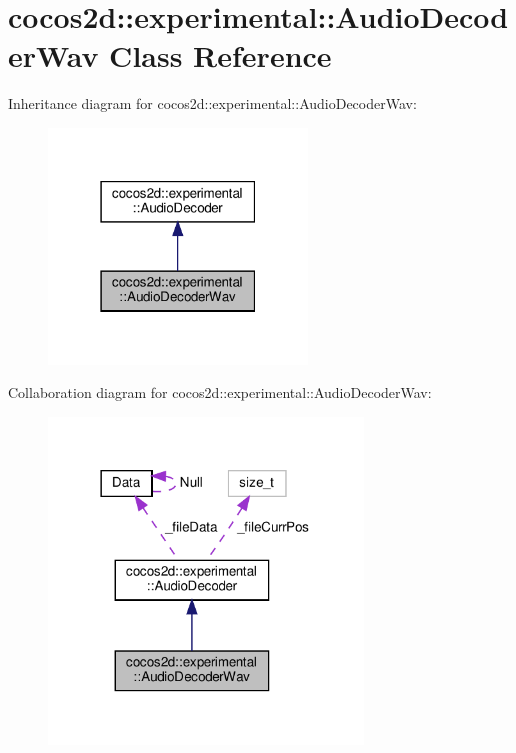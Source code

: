 \hypertarget{classcocos2d_1_1experimental_1_1AudioDecoderWav}{}\section{cocos2d\+:\+:experimental\+:\+:Audio\+Decoder\+Wav Class Reference}
\label{classcocos2d_1_1experimental_1_1AudioDecoderWav}


Inheritance diagram for cocos2d\+:\+:experimental\+:\+:Audio\+Decoder\+Wav\+:
\nopagebreak
\begin{figure}[H]
\begin{center}
\leavevmode
\includegraphics[width=195pt]{classcocos2d_1_1experimental_1_1AudioDecoderWav__inherit__graph}
\end{center}
\end{figure}


Collaboration diagram for cocos2d\+:\+:experimental\+:\+:Audio\+Decoder\+Wav\+:
\nopagebreak
\begin{figure}[H]
\begin{center}
\leavevmode
\includegraphics[width=237pt]{classcocos2d_1_1experimental_1_1AudioDecoderWav__coll__graph}
\end{center}
\end{figure}
